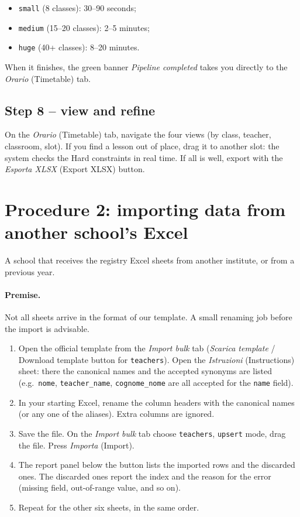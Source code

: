 \begin{itemize}
\item \texttt{small} (8 classes): 30--90 seconds;
\item \texttt{medium} (15--20 classes): 2--5 minutes;
\item \texttt{huge} (40+ classes): 8--20 minutes.
\end{itemize}

When it finishes, the green banner \emph{Pipeline completed}
takes you directly to the \emph{Orario} (Timetable) tab.

\subsection{Step 8 -- view and refine}

On the \emph{Orario} (Timetable) tab, navigate the four views (by
class, teacher, classroom, slot). If you find a lesson out of
place, drag it to another slot: the system checks the Hard
constraints in real time. If all is well, export with the
\emph{Esporta XLSX} (Export XLSX) button.


\section{Procedure 2: importing data from another school's Excel}
\label{sec:wf_import_excel}

A school that receives the registry Excel sheets from another
institute, or from a previous year.

\paragraph{Premise.} Not all sheets arrive in the format of our
template. A small renaming job before the import is advisable.

\begin{enumerate}
\item Open the official template from the \emph{Import bulk} tab
  (\emph{Scarica template} / Download template button for
  \texttt{teachers}). Open the \emph{Istruzioni} (Instructions)
  sheet: there the canonical names and the accepted synonyms are
  listed (e.g.\ \texttt{nome}, \texttt{teacher\_name},
  \texttt{cognome\_nome} are all accepted for the \texttt{name}
  field).
\item In your starting Excel, rename the column headers with the
  canonical names (or any one of the aliases). Extra columns are
  ignored.
\item Save the file. On the \emph{Import bulk} tab choose
  \texttt{teachers}, \texttt{upsert} mode, drag the file. Press
  \emph{Importa} (Import).
\item The report panel below the button lists the imported rows
  and the discarded ones. The discarded ones report the index
  and the reason for the error (missing field, out-of-range
  value, and so on).
\item Repeat for the other six sheets, in the same order.
\end{enumerate}

